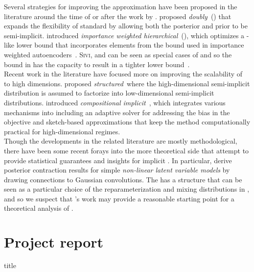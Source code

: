 \documentclass[10pt]{article}
\begin{document}
Several strategies for improving the \sivi approximation have been proposed in the literature around the time of or after the work by \citet{Titsias:2019}. \citet{Molchanov:2019} proposed \textit{doubly}~\sivi (\dsivi) that expands the flexibility of standard \sivi by allowing both the posterior and prior to be semi-implicit. \citet{Sobolev:2019} introduced \textit{importance weighted hierarchical}~\vi (\iwhvi), which optimizes a \sivi-like lower bound that incorporates elements from the bound used in importance weighted autoencoders~\citep{Burda:2015}. \textsc{Sivi}, \dsivi and \hvm can be seen as special cases of \iwhvi and so the bound in \iwhvi has the capacity to result in a tighter lower bound~\citep{Sobolev:2019}.
\\

Recent work in the literature have focused more on improving the scalability of \sivi to high dimensions. \citet{Molchanova:2019} proposed \textit{structured}~\sivi where the high-dimensional semi-implicit distribution is assumed to factorize into low-dimensional semi-implicit distributions. \citet{Moens:2021} introduced \textit{compositional implicit}~\vi, which integrates various mechanisms into \sivi including an adaptive solver for addressing the bias in the \sivi objective and sketch-based approximations that keep the method computationally practical for high-dimensional regimes.
\\

Though the developments in the related literature are mostly methodological, there have been some recent forays into the more theoretical side that attempt to provide statistical guarantees and insights for implicit \vi. In particular, \citet{Plummer:2021} derive posterior contraction results for simple \textit{non-linear latent variable models} by drawing connections to Gaussian convolutions. The \nllvm has a structure that can be seen as a particular choice of the reparameterization and mixing distributions in \uivi, and so we suspect that \citeauthor{Plummer:2021}'s work may provide a reasonable starting point for a theoretical analysis of \uivi.


\newpage


\section{Project report}

\todo title

\vspace{2em}
\begin{abstract}
\todo
\end{abstract}
\vspace{2em}
\end{document}
